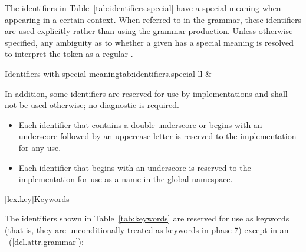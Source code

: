 \pnum
The identifiers in Table~\ref{tab:identifiers.special} have a special meaning when
appearing in a certain context. When referred to in the grammar, these identifiers
are used explicitly rather than using the  grammar production.
Unless otherwise specified, any ambiguity as to whether a given
 has a special meaning is resolved to interpret the
token as a regular .

\begin{floattable}{Identifiers with special meaning}{tab:identifiers.special}
{ll}
\topline
{}        &
           \\
\end{floattable}

\pnum
{}%
%
%
In addition, some identifiers are reserved for use by \Cpp
implementations and shall
not be used otherwise; no diagnostic is required.%
\begin{itemize}
\item
Each identifier that contains a double underscore
\tcode{\unun}
%
or begins with an underscore followed by
an uppercase letter
%
is reserved to the implementation for any use.
\item
Each identifier that begins with an underscore is
%
reserved to the implementation for use as a name in the global namespace.%
\end{itemize}

[lex.key]{Keywords}

\enlargethispage{\baselineskip}%
\pnum
{}%
The identifiers shown in Table~\ref{tab:keywords} are reserved for use
as keywords (that is, they are unconditionally treated as keywords in
phase 7) except in an ~(\ref{dcl.attr.grammar}):

